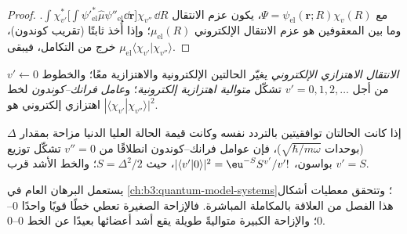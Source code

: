 \begin{proof}
مع $\Psi = \psi_{\mathrm{el}}(\mathbf r;R)\chi_v(R)$، يكون عزم الانتقال
$\int\chi_{v'}^*\big[\int\psi'^*_{\mathrm{el}}\hat\mu\psi''_{\mathrm{el}}\dd\mathbf r\big]
\chi_{v''}\,\dd R$. وما بين المعقوفين هو عزم الانتقال الإلكتروني
$\mu_{\mathrm{el}}(R)$؛ وإذا أُخذ ثابتًا (تقريب كوندون)، خرج من
التكامل، فيبقى $\mu_{\mathrm{el}}\langle\chi_{v'}|\chi_{v''}\rangle$.
\end{proof}

\begin{definition}\label{def:b3:electronic-spectroscopy:vibronic}
\emph{الانتقال الاهتزازي الإلكتروني} يغيّر الحالتين الإلكترونية
والاهتزازية معًا؛ والخطوط $v' \leftarrow 0$ من أجل $v' = 0, 1, 2,
\dots$ تشكّل \emph{متوالية اهتزازية إلكترونية}؛ 
و\emph{عامل فرانك--كوندون} لخط اهتزازي إلكتروني هو
$|\langle\chi_{v'}|\chi_{v''}\rangle|^2$.
\end{definition}

\begin{proposition}\label{prop:b3:electronic-spectroscopy:displaced}
إذا كانت الحالتان توافقيتين بالتردد نفسه وكانت قيمة الحالة العليا الدنيا
مزاحة بمقدار $\Delta$ (بوحدات $\sqrt{\hbar/m\omega}$)، فإن عوامل فرانك--كوندون
انطلاقًا من $v'' = 0$ تشكّل توزيع بواسون،
$|\langle v'|0\rangle|^2 = \eu^{-S}S^{v'}/v'!$، حيث $S = \Delta^2/2$؛ والخط الأشد
قرب $v' = S$.
\end{proposition}
\admitted

يستعمل البرهان العام  في
\cref{ch:b3:quantum-model-systems}؛ وتتحقق معطيات أشكال هذا الفصل من
العلاقة بالمكاملة المباشرة. فالإزاحة الصغيرة تعطي خطًا قويًا واحدًا
0--0؛ والإزاحة الكبيرة متواليةً طويلة يقع أشد أعضائها بعيدًا عن
الخط 0--0.

